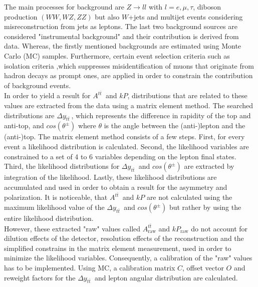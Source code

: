\documentclass[11pt, twocolumn, a4paper]{article}
\newcommand{\ttbarsm}{{t \overline{t} \; }}
\begin{document}
The main processes for background are ${Z \rightarrow ll}$ with ${l=e,\mu,\tau}$,
diboson production $(WW,WZ,ZZ)$ but also $W$+jets and multijet events considering 
misreconstruction from jets as leptons.
The last two background sources are considered "instrumental background" and 
their contribution is derived from data.
Whereas, the firstly mentioned backgrounds are estimated using Monte Carlo (MC) samples.
Furthermore, certain event selection criteria such as isolation criteria ,which 
suppresses misidentification of muons that originate from hadron decays as prompt ones, 
are applied in order to constrain the contribution of background events.\\
In order to yield a result for $A^{\ttbarsm}$ and $kP$, distributions that are related to these
values are extracted from the data using a matrix element method\cite{matrix}.
The searched distributions are $\Delta{y}_{\ttbarsm}$, which represents the difference in rapidity
of the top and anti-top, and $cos(\theta^{\pm})$ where $\theta$ is the angle between the (anti-)lepton and
the (anti-)top.
The matrix element method consists of a few steps.
First, for every event a likelihood distribution is calculated.
Second, the likelihood variables are constrained to a set of 4 to 6 variables depending on the lepton final states.
Third, the likelihood distributions for $\Delta{y}_{\ttbarsm}$ and $cos(\theta^{\pm})$ are extracted by integration of the likelihood.
Lastly, these likelihood distributions are accumulated and used in order to obtain a result for the asymmetry and polarization.
It is noticeable, that $A^{\ttbarsm}$ and $kP$ are not calculated using the maximum likelihood value of the $\Delta{y}_{\ttbarsm}$ and $cos(\theta^{\pm})$ but rather by using the entire likelihood distribution.\\
However, these extracted "raw" values called $A^{\ttbarsm}_\text{raw}$ and $kP_\text{raw}$ do not account for dilution effects of the detector, resolution effects of the reconstruction and the simplified constrains in the matrix element measurement, used in order to minimize the likelihood variables.
Consequently, a calibration of the "raw" values has to be implemented.
Using MC, a calibration matrix $C$, offset vector $O$ and reweight factors for the $\Delta{y}_{\ttbarsm}$ and lepton angular distribution are calculated.
\end{document}
